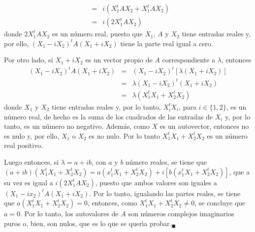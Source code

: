 \begin{solucion}
\begin{eqnarray*}
  & = & i\left( X_1^tAX_2 + X_1^tAX_2 \right) \\
  & = & i\left(2X_1^tAX_2\right)
 \end{eqnarray*}
 donde $2X_1^tAX_2$ es un n\'umero real, puesto que $X_1$, $A$ y $X_2$ tiene entradas reales y, por ello, $(X_1 - iX_2)^tA(X_1 + iX_2)$ tiene la parte real igual a cero.
 \par 
 Por otro lado, si $X_1 + iX_2$ es un vector propio de $A$ correspondiente a $\lambda$, entonces
 \begin{eqnarray*}
  (X_1-iX_2)^tA(X_1+iX_2) 
  & = & (X_1-iX_2)^t\left[ \lambda(X_1+iX_2) \right] \\
  & = & \lambda(X_1-iX_2)^t(X_1+iX_2) \\
  & = & \lambda(X_1^tX_1 + X_2^tX_2)
 \end{eqnarray*}
 donde $X_1$ y $X_2$ tiene entradas reales y, por lo tanto, $X_i^tX_i$, para $i\in\{1,2\}$, es un n\'umero real, de hecho es la suma de los cuadrados de las entradas de $X_i$ y, por lo tanto, es un n\'umero no negativo. Adem\'as, como $X$ es un autovector, entonces no es nulo y, por ello, $X_1$ o $X_2$ es no nulo. Por lo tanto $X_1^tX_1 + X_2^tX_2$ es un n\'umero real positivo.
 \par
 Luego entonces, si $\lambda = a + ib$, con $a$ y $b$ n\'umero reales, se tiene que $(a+ib)(X_1^tX_1 + X_2^tX_2) = a(x_1^tX_1 + X_2^tX_2) + i\left[b(x_1^tX_1+X_2^tX_2) \right]$, que a su vez es igual a $i(2X_1^tAX_2)$, puesto que ambos valores son iguales a $(X_1-ix_2)^tA(X_1+iX_2)$. Por lo tanto, igualando las partes reales, se tiene que $a(X_1^tX_1 + X_2^tX_2) = 0$, entonces, como  $X_1^tX_1 + X_2^tX_2 \neq 0$, se concluye que $a = 0$. Por lo tanto, los autovalores de $A$ son n\'umeros complejos imaginarios puros o, bien, son nulos, que es lo que se quer\'{\i}a probar.${}_{\blacksquare}$
\end{solucion}

